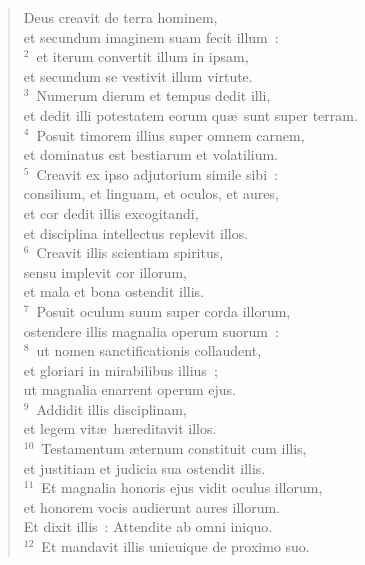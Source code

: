 \begin{flushleft}\begin{verse}\vspace{-19pt}\hspace{6pt}Deus creavit de terra hominem,\\\hspace{6pt} et secundum imaginem suam fecit illum~:\\
${}^{2}$~et iterum convertit illum in ipsam,\\ et secundum se vestivit illum virtute.\\
${}^{3}$~Numerum dierum et tempus dedit illi,\\ et dedit illi potestatem eorum qu\ae\ sunt super terram.\\
${}^{4}$~Posuit timorem illius super omnem carnem,\\ et dominatus est bestiarum et volatilium.\\
${}^{5}$~Creavit ex ipso adjutorium simile sibi~:\\ consilium, et linguam, et oculos, et aures,\\ et cor dedit illis excogitandi,\\ et disciplina intellectus replevit illos.\\
${}^{6}$~Creavit illis scientiam spiritus,\\ sensu implevit cor illorum,\\ et mala et bona ostendit illis.\\
${}^{7}$~Posuit oculum suum super corda illorum,\\ ostendere illis magnalia operum suorum~:\\
${}^{8}$~ut nomen sanctificationis collaudent,\\ et gloriari in mirabilibus illius~;\\ ut magnalia enarrent operum ejus.\\
${}^{9}$~Addidit illis disciplinam,\\ et legem vit\ae\ h\ae reditavit illos.\\
${}^{10}$~Testamentum \ae ternum constituit cum illis,\\ et justitiam et judicia sua ostendit illis.\\
${}^{11}$~Et magnalia honoris ejus vidit oculus illorum,\\ et honorem vocis audierunt aures illorum.\\ Et dixit illis~: Attendite ab omni iniquo.\\
${}^{12}$~Et mandavit illis unicuique de proximo suo.\\

\end{verse}
\end{flushleft}
